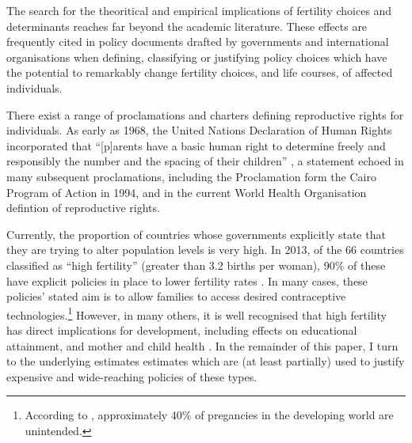 The search for the theoritical and empirical implications of fertility choices
and determinants reaches far beyond the academic literature. These effects are
frequently cited in policy documents drafted by governments and international 
organisations when defining, classifying or justifying policy choices which have
the potential to remarkably change fertility choices, and life courses, of 
affected individuals.

There exist a range of proclamations and charters defining reproductive rights
for individuals.  As early as 1968, the United Nations Declaration of Human 
Rights incorporated that ``[p]arents have a basic human right to determine 
freely and responsibly the number and the spacing of their children'' 
\citep{UN1968}, a statement echoed in many subsequent proclamations, 
including the Proclamation form the Cairo Program of Action in 1994, and in the 
current World Health Organisation defintion of reproductive rights. 

Currently, the proportion of countries whose governments explicitly state that
they are trying to alter population levels is very high.  In 2013, of the 66 
countries classified as ``high fertility'' (greater than 3.2 births per woman), 
90\% of these have explicit policies in place to lower fertility rates 
\citep{UN2013}.  In many cases, these policies' stated aim is to allow families
to access desired contraceptive technologies.\footnote{According to 
\citet{BongaartsSinding2011}, approximately 40\% of pregancies in the developing
world are unintended.}  However, in many others, it is well recognised that
high fertility has direct implications for development, including effects on 
educational attainment, and mother and child health \citep{UN2013}.  In the
remainder of this paper, I turn to the underlying estimates estimates which are
(at least partially) used to justify expensive and wide-reaching policies of 
these types.

